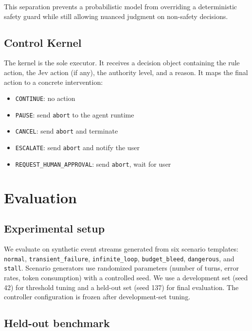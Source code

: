 \documentclass[11pt,a4paper]{article}
\begin{document}
This separation prevents a probabilistic model from overriding a deterministic safety guard while still allowing nuanced judgment on non-safety decisions.

\subsection{Control Kernel}

The kernel is the sole executor. It receives a decision object containing the rule action, the Jev action (if any), the authority level, and a reason. It maps the final action to a concrete intervention:

\begin{itemize}
\item \texttt{CONTINUE}: no action
\item \texttt{PAUSE}: send \texttt{abort} to the agent runtime
\item \texttt{CANCEL}: send \texttt{abort} and terminate
\item \texttt{ESCALATE}: send \texttt{abort} and notify the user
\item \texttt{REQUEST\_HUMAN\_APPROVAL}: send \texttt{abort}, wait for user
\end{itemize}

\section{Evaluation}

\subsection{Experimental setup}

We evaluate on synthetic event streams generated from six scenario templates: \texttt{normal}, \texttt{transient\_failure}, \texttt{infinite\_loop}, \texttt{budget\_bleed}, \texttt{dangerous}, and \texttt{stall}. Scenario generators use randomized parameters (number of turns, error rates, token consumption) with a controlled seed. We use a development set (seed 42) for threshold tuning and a held-out set (seed 137) for final evaluation. The controller configuration is frozen after development-set tuning.

\subsection{Held-out benchmark}
\end{document}
